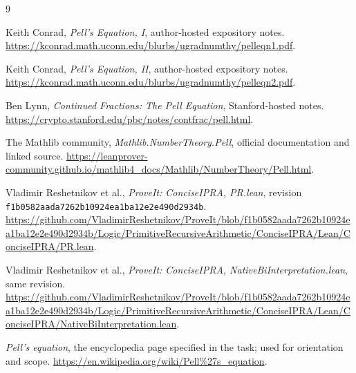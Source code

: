 \documentclass[11pt,letterpaper]{article}
\theoremstyle{definition}
\begin{document}
\begin{thebibliography}{9}
\raggedright
{}
Keith Conrad, \emph{Pell's Equation, I}, author-hosted expository notes.
\url{https://kconrad.math.uconn.edu/blurbs/ugradnumthy/pelleqn1.pdf}.

Keith Conrad, \emph{Pell's Equation, II}, author-hosted expository notes.
\url{https://kconrad.math.uconn.edu/blurbs/ugradnumthy/pelleqn2.pdf}.

Ben Lynn, \emph{Continued Fractions: The Pell Equation}, Stanford-hosted notes.
\url{https://crypto.stanford.edu/pbc/notes/contfrac/pell.html}.

The Mathlib community, \emph{Mathlib.NumberTheory.Pell}, official
documentation and linked source.
\url{https://leanprover-community.github.io/mathlib4_docs/Mathlib/NumberTheory/Pell.html}.

Vladimir Reshetnikov et al., \emph{ProveIt: ConciseIPRA, PR.lean},
revision \texttt{f1b0582aada7262b10924ea1ba12e2e490d2934b}.
\url{https://github.com/VladimirReshetnikov/ProveIt/blob/f1b0582aada7262b10924ea1ba12e2e490d2934b/Logic/PrimitiveRecursiveArithmetic/ConciseIPRA/Lean/ConciseIPRA/PR.lean}.

Vladimir Reshetnikov et al., \emph{ProveIt: ConciseIPRA,
NativeBiInterpretation.lean}, same revision.
\url{https://github.com/VladimirReshetnikov/ProveIt/blob/f1b0582aada7262b10924ea1ba12e2e490d2934b/Logic/PrimitiveRecursiveArithmetic/ConciseIPRA/Lean/ConciseIPRA/NativeBiInterpretation.lean}.

\emph{Pell's equation}, the encyclopedia page specified in the task;
used for orientation and scope.
\url{https://en.wikipedia.org/wiki/Pell\%27s_equation}.
\end{thebibliography}
\end{document}
